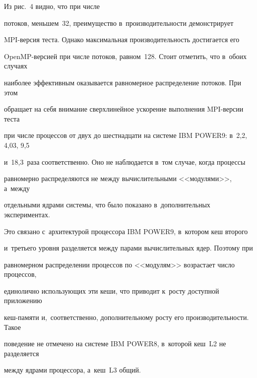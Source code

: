 Из рис.~4 видно, что при чис\-ле 


потоков, мень\-шем~32, преимущество в~производительности демонстрирует  


MPI-вер\-сия теста. Однако максимальная производительность достигается его  


\mbox{OpenMP}-вер\-си\-ей при числе потоков, равном~128. Стоит отметить, что в~обоих случаях 


наиболее эффективным оказывается равномерное распределение потоков. При этом 


обращает на себя внимание сверхлинейное ускорение выполнения MPI-вер\-сии теста 


при числе процессов от двух до шестнадцати на системе IBM \mbox{POWER9}: в~2,2, 4,03, 9,5 


и~18,3~раза соответственно. Оно не наблюдается в~том случае, когда процессы 


равномерно распределяются не между вычислительными <<модулями>>, а~между 


отдельными ядрами системы, что было показано в~дополнительных экспериментах. 


Это связано с~архитектурой процессора IBM POWER9, в~котором кеш второго 


и~третьего уровня разделяется между парами вычислительных ядер. Поэтому при 


равномерном распределении процессов по <<модулям>> возрастает число процессов, 


единолично использующих эти кеши, что приводит к~росту доступной приложению 


кеш-па\-мя\-ти и,~соответственно, дополнительному росту его производительности. Такое 


поведение не отмечено на системе IBM POWER8, в~которой кеш~L2 не разделяется 


между ядрами процессора, а~кеш~L3 общий.








